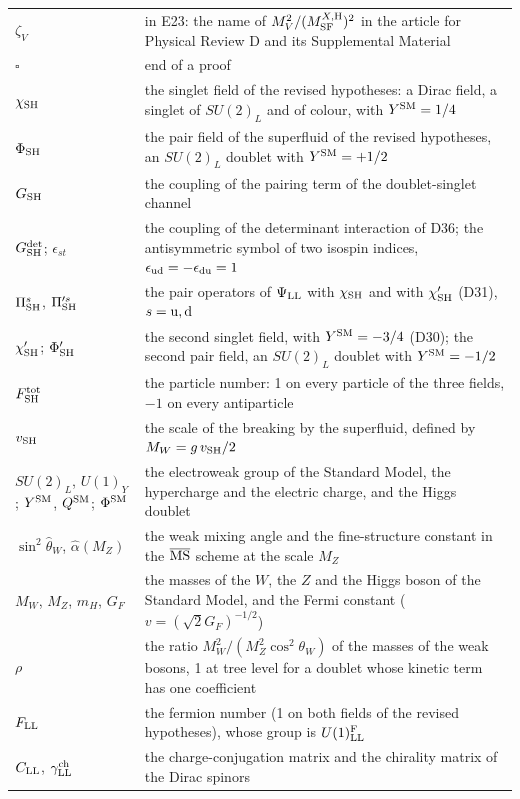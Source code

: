\documentclass[
  10pt,
]{article}
\begin{document}
\begin{longtable}[]{@{}
  >{\raggedright\arraybackslash}p{}
  >{\raggedright\arraybackslash}p{}@{}}
\(\zeta_V\) & in E23: the name of \(M_V^2/(M^{X,{\rm H}}_{\rm SF})^2\)
in the article for Physical Review D and its Supplemental Material \\
\(\square\) & end of a proof \\
\(\chi_{\rm SH}\) & the singlet field of the revised hypotheses: a Dirac
field, a singlet of \(SU(2)_L\) and of colour, with
\(Y^{\rm SM}=1/4\) \\
\(\Phi_{\rm SH}\) & the pair field of the superfluid of the revised
hypotheses, an \(SU(2)_L\) doublet with \(Y^{\rm SM}=+1/2\) \\
\(G_{\rm SH}\) & the coupling of the pairing term of the doublet-singlet
channel \\
\(G^{\rm det}_{\rm SH}\); \(\epsilon_{st}\) & the coupling of the
determinant interaction of D36; the antisymmetric symbol of two isospin
indices, \(\epsilon_{\rm ud}=-\epsilon_{\rm du}=1\) \\
\(\Pi^s_{\rm SH}\), \(\Pi'^s_{\rm SH}\) & the pair operators of
\(\Psi_{\rm LL}\) with \(\chi_{\rm SH}\) and with \(\chi'_{\rm SH}\)
(D31), \(s={\rm u},{\rm d}\) \\
\(\chi'_{\rm SH}\); \(\Phi'_{\rm SH}\) & the second singlet field, with
\(Y^{\rm SM}=-3/4\) (D30); the second pair field, an \(SU(2)_L\) doublet
with \(Y^{\rm SM}=-1/2\) \\
\(F^{\rm tot}_{\rm SH}\) & the particle number: 1 on every particle of
the three fields, \(-1\) on every antiparticle \\
\(v_{\rm SH}\) & the scale of the breaking by the superfluid, defined by
\(M_W=g\,v_{\rm SH}/2\) \\
\(SU(2)_L\), \(U(1)_Y\); \(Y^{\rm SM}\), \(Q^{\rm SM}\);
\(\Phi^{\rm SM}\) & the electroweak group of the Standard Model, the
hypercharge and the electric charge, and the Higgs doublet \\
\(\sin^2\hat\theta_W\), \(\hat\alpha(M_Z)\) & the weak mixing angle and
the fine-structure constant in the \(\overline{\rm MS}\) scheme at the
scale \(M_Z\) \\
\(M_W\), \(M_Z\), \(m_H\), \(G_F\) & the masses of the \(W\), the \(Z\)
and the Higgs boson of the Standard Model, and the Fermi constant
(\(v=(\sqrt2G_F)^{-1/2}\)) \\
\(\rho\) & the ratio \(M_W^2/(M_Z^2\cos^2\theta_W)\) of the masses of
the weak bosons, 1 at tree level for a doublet whose kinetic term has
one coefficient \\
\(F_{\rm LL}\) & the fermion number (1 on both fields of the revised
hypotheses), whose group is \(U(1)^{\rm F}_{\rm LL}\) \\
\(C_{\rm LL}\), \(\gamma^{\rm ch}_{\rm LL}\) & the charge-conjugation
matrix and the chirality matrix of the Dirac spinors \\
\end{longtable}
\end{document}
